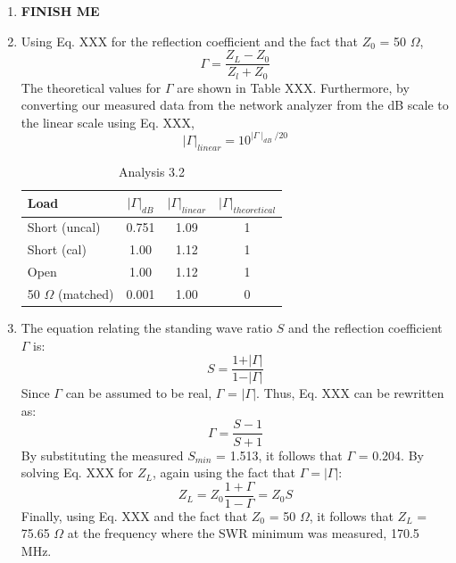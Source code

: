 \documentclass{article}
\begin{document}
\begin{enumerate}
	\item \textbf{FINISH ME}
	
	\item Using Eq. XXX for the reflection coefficient and the fact that $Z_0$ = 50 $\Omega$,
	\begin{equation}
		\Gamma = \frac{Z_L-Z_0}{Z_l+Z_0}
	\end{equation}
	The theoretical values for $\Gamma$ are shown in Table XXX. Furthermore, by converting our measured data from the network analyzer from the dB scale to the linear scale using Eq. XXX,
	\begin{equation}
		\vert\Gamma\vert_{linear} = 10^{\mid\Gamma\mid_{dB}/20}
	\end{equation}
	
	\begin{table}[H]
	\centering
		\begin{tabular}{|l|c|c|c|}
		\hline
		\textbf{Load}     & $\vert\Gamma\vert_{dB}$ & $\vert\Gamma\vert_{linear}$ & $\vert\Gamma\vert_{theoretical}$ \\ \hline
		Short (uncal)     & 0.751 	  & 1.09      &    1      \\ \hline
		Short (cal)       & 1.00      & 1.12      &    1      \\ \hline
		Open              & 1.00  	  & 1.12      &    1      \\ \hline
		50 $\Omega$ (matched) & 0.001 & 1.00  	  &    0      \\ \hline
		\end{tabular}
		\caption{Analysis 3.2}
		\label{}
	\end{table}	

	\item The equation relating the standing wave ratio $S$ and the reflection coefficient $\Gamma$ is:
	\begin{equation} 
		S = \frac{1 + \vert\Gamma\vert}{1 - \vert\Gamma\vert}
	\end{equation}
	Since $\Gamma$ can be assumed to be real, $\Gamma$ = $\vert\Gamma\vert$. Thus, Eq. XXX can be rewritten as:
	\begin{equation}
		\Gamma = \frac{S - 1}{S + 1}
	\end{equation}
	By substituting the measured $S_{min}$ = 1.513, it follows that $\Gamma$ = 0.204. By solving Eq. XXX for $Z_L$, again using the fact that $\Gamma = \vert\Gamma\vert$:
	\begin{equation}
		Z_L = Z_0\frac{1 + \Gamma}{1 - \Gamma} = Z_0 S
	\end{equation}	 
	Finally, using Eq. XXX and the fact that $Z_0$ = 50 $\Omega$, it follows that $Z_L$ = 75.65 $\Omega$ at the frequency where the SWR minimum was measured, 170.5 MHz.
\end{enumerate}
\end{document}
